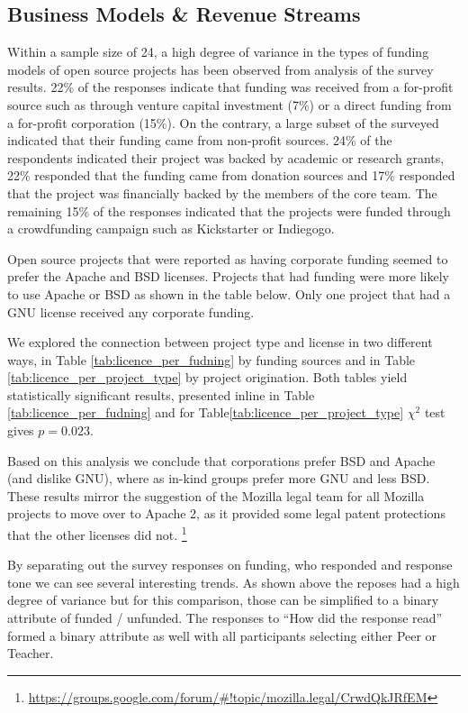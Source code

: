 \subsection{Business Models \& Revenue Streams}

Within a sample size of 24, a high degree of variance in the types of funding models of open source projects has been observed from analysis of the survey results. 22\% of the responses indicate that funding was received from a for-profit source such as through venture capital investment (7\%) or a direct funding from a for-profit corporation (15\%). On the contrary, a large subset of the surveyed indicated that their funding came from non-profit sources. 24\% of the respondents indicated their project was backed by academic or research grants, 22\% responded that the funding came from donation sources and 17\% responded that the project was financially backed by the members of the core team. The remaining 15\% of the responses indicated that the projects were funded through a crowdfunding campaign such as Kickstarter or Indiegogo.


Open source projects that were reported as having corporate funding seemed to prefer the Apache and BSD licenses. Projects that had funding were more likely to use Apache or BSD as shown in the table below. Only one project that had a GNU license received any corporate funding. 



We explored the connection between project type and license in two different ways, in Table \ref{tab:licence_per_fudning} by funding sources and in Table \ref{tab:licence_per_project_type} by project origination. Both tables yield statistically significant results, presented inline in Table \ref{tab:licence_per_fudning} and for Table\ref{tab:licence_per_project_type} $\chi^2$ test gives $p=0.023$.

Based on this analysis we conclude that corporations prefer BSD and Apache (and dislike GNU), where as in-kind groups prefer more GNU and less BSD. These results mirror the suggestion of the Mozilla legal team for all Mozilla projects to move over to Apache 2, as it provided some legal patent protections that the other licenses did not. \footnote{\url{https://groups.google.com/forum/#!topic/mozilla.legal/CrwdQkJRfEM}}

By separating out the survey responses on funding, who responded and response tone we can see several interesting trends. As shown above the reposes had a high degree of variance but for this comparison, those can be simplified to a binary attribute of funded / unfunded. The responses to “How did the response read” formed a binary attribute as well with all participants selecting either Peer or Teacher.

